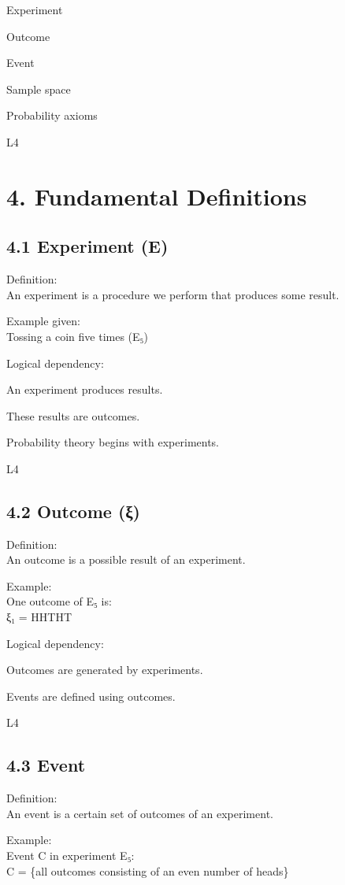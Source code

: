 \documentclass[12pt]{article}
\begin{document}
Experiment

Outcome

Event

Sample space

Probability axioms 

L4

\section*{4. Fundamental Definitions}

\subsection*{4.1 Experiment (E)}

Definition: \\
An experiment is a procedure we perform that produces some result.

Example given: \\
Tossing a coin five times (E₅)

Logical dependency:

An experiment produces results.

These results are outcomes.

Probability theory begins with experiments. 

L4

\subsection*{4.2 Outcome (ξ)}

Definition: \\
An outcome is a possible result of an experiment.

Example: \\
One outcome of E₅ is: \\
ξ₁ = HHTHT

Logical dependency:

Outcomes are generated by experiments.

Events are defined using outcomes. 

L4

\subsection*{4.3 Event}

Definition: \\
An event is a certain set of outcomes of an experiment.

Example: \\
Event C in experiment E₅: \\
C = \{all outcomes consisting of an even number of heads\}
\end{document}
